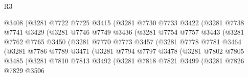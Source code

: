 \begin{lexlean}{R3}
\begin{coremodule}
                          @3408
                          (@3281
                            @7722
                            @7725
                            @3415
                            (@3281
                              @7730
                              @7733
                              @3422
                              (@3281
                                @7738
                                @7741
                                @3429
                                (@3281
                                  @7746
                                  @7749
                                  @3436
                                  (@3281
                                    @7754
                                    @7757
                                    @3443
                                    (@3281
                                      @7762
                                      @7765
                                      @3450
                                      (@3281
                                        @7770
                                        @7773
                                        @3457
                                        (@3281
                                          @7778
                                          @7781
                                          @3464
                                          (@3281
                                            @7786
                                            @7789
                                            @3471
                                            (@3281
                                              @7794
                                              @7797
                                              @3478
                                              (@3281
                                                @7802
                                                @7805
                                                @3485
                                                (@3281
                                                  @7810
                                                  @7813
                                                  @3492
                                                  (@3281
                                                    @7818
                                                    @7821
                                                    @3499
                                                    (@3281
                                                      @7826
                                                      @7829
                                                      @3506

\end{coremodule}
\end{lexlean}
